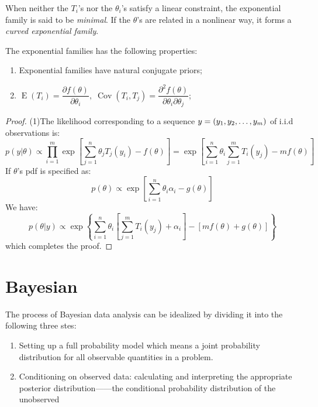 \begin{definition}
	When neither the $T_i$'s nor the $\theta_i$'s satisfy a linear constraint, the exponential family is said to be \emph{minimal}. If the $\theta$'s are related in a nonlinear way, it forms a \emph{curved exponential family}.
\end{definition}
\begin{property}
	The exponential families has the following properties:
	\begin{enumerate}
		\item Exponential families have natural conjugate priors;
		\item $\operatorname{E}(T_i)=\dfrac{\partial f(\theta)}{\partial\theta_i},\;\operatorname{Cov}(T_i,T_j)=\dfrac{\partial^2f(\theta)}{\partial\theta_i\partial\theta_j}$;
	\end{enumerate}
\end{property}
\begin{proof}
	(1)The likelihood corresponding to a sequence $y = (y_1, y_2, \dots, y_{m})$ of i.i.d observations is:
	\begin{equation*}
		p(y|\theta)\propto\prod_{i=1}^{m}\exp\left[\sum_{j=1}^{n}\theta_jT_j(y_i)-f(\theta)\right]=\exp\left[\sum_{i=1}^{n}\theta_i\sum_{j=1}^{m}T_i(y_j)-mf(\theta)\right]
	\end{equation*}
	If $\theta$'s pdf is specified as:
	\begin{equation*}
		p(\theta)\propto\exp\left[\sum_{i=1}^{n}\theta_i\alpha_i-g(\theta)\right]
	\end{equation*}
	We have:
	\begin{equation*}
		p(\theta|y)\propto\exp\left\{\sum_{i=1}^{n}\theta_i\left[\sum_{j=1}^{m}T_i(y_j)+\alpha_i\right]-[mf(\theta)+g(\theta)]\right\}
	\end{equation*}
	which completes the proof.
\end{proof}


\section{Bayesian}
The process of Bayesian data analysis can be idealized by dividing it into the following three stes:
\begin{enumerate}
	\item Setting up a full probability model which means a joint probability distribution for all observable quantities in a problem.
	\item  Conditioning on observed data: calculating and interpreting the appropriate posterior distribution——the conditional probability distribution of the unobserved
\end{enumerate}

